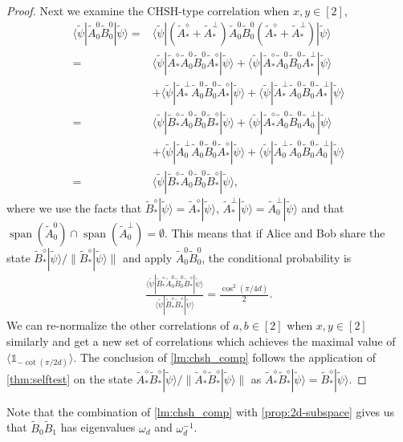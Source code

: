 \documentclass[11pt,letterpaper]{article}
\newcommand{\ket}[1]{|#1\rangle}
\newcommand{\bra}[1]{\langle#1|}
\DeclareMathOperator{\spn}{span}
\newcommand{\1}{\mathbb{1}}
\newcommand{\tA}{\tilde{A}}
\newcommand{\tB}{\tilde{B}}
\newcommand{\tpsi}{\tilde{\psi}}
\theoremstyle{definition}
\begin{document}
\begin{proof}
Next we examine the CHSH-type correlation when $x,y \in [2]$,
\begin{align*}
	   \bra{\tpsi} \tA_0^0\tB_0^0 \ket{\tpsi} 
	= &\bra{\tpsi}(\tA_\ast^\diamond + \tA_\ast^\perp) \tA_0^0\tB_0^0 (\tA_\ast^\diamond + \tA_\ast^\perp)\ket{\tpsi} \\
	= & \bra{\tpsi}\tA_\ast^\diamond \tA_0^0\tB_0^0 \tA_\ast^\diamond\ket{\tpsi} + \bra{\tpsi}\tA_\ast^\diamond \tA_0^0\tB_0^0 \tA_\ast^\perp\ket{\tpsi} \\
	&+\bra{\tpsi}\tA_\ast^\perp \tA_0^0\tB_0^0 \tA_\ast^\diamond\ket{\tpsi} + \bra{\tpsi}\tA_\ast^\perp \tA_0^0\tB_0^0 \tA_\ast^\perp\ket{\tpsi}\\
	= & \bra{\tpsi}\tB_\ast^\diamond \tA_0^0\tB_0^0 \tB_\ast^\diamond\ket{\tpsi} + \bra{\tpsi}\tA_\ast^\diamond \tA_0^0\tB_0^0 \tA_0^\perp\ket{\tpsi} \\
	&+\bra{\tpsi}\tA_0^\perp \tA_0^0\tB_0^0 \tA_\ast^\diamond\ket{\tpsi} + \bra{\tpsi}\tA_0^\perp \tA_0^0\tB_0^0 \tA_0^\perp\ket{\tpsi}\\
	=&\bra{\tpsi}\tB_\ast^\diamond \tA_0^0\tB_0^0 \tB_\ast^\diamond\ket{\tpsi},
\end{align*}
where we use the facts that $\tB_\ast^\diamond \ket{\tpsi} = \tA_\ast^\diamond \ket{\tpsi}$, $\tA_\ast^\perp \ket{\tpsi} = \tA_0^\perp \ket{\tpsi}$ and that 
$\spn(\tA_0^0) \cap \spn(\tA_0^\perp) = \emptyset$. 
This means that if Alice and Bob share the state $\tB_\ast^\diamond \ket{\tpsi}/\|\tB_\ast^\diamond \ket{\tpsi}\|$ and apply 
$\tA_0^0\tB_0^0$, the conditional probability is
\begin{align}
	\frac{\bra{\tpsi}\tB_\ast^\diamond \tA_0^0\tB_0^0 \tB_\ast^\diamond\ket{\tpsi}}{\bra{\tpsi} \tB_\ast^\diamond \tB_\ast^\diamond \ket{\tpsi}} = \frac{\cos^2(\pi/4d)}{2}.
\end{align} 
We can re-normalize the other correlations of $a,b \in [2]$ when $x,y \in [2]$ similarly and get a new set of correlations 
which achieves the maximal value of $\langle \1_{-\cot(\pi/2d)}\rangle$. 
The conclusion of \cref{lm:chsh_comp} follows the application of \cref{thm:selftest} on the state $\tA_\ast^\diamond\tB_\ast^\diamond \ket{\tpsi}/\|\tA_\ast^\diamond\tB_\ast^\diamond \ket{\tpsi}\|$ as $\tA_\ast^\diamond\tB_\ast^\diamond \ket{\tpsi} = \tB_\ast^\diamond \ket{\tpsi}$.
\end{proof}
Note that the combination of \cref{lm:chsh_comp} with \cref{prop:2d-subspace} gives us that 
$\tB_0\tB_1$ has eigenvalues $\omega_d$ and $\omega_d^{-1}$.

\end{document}

